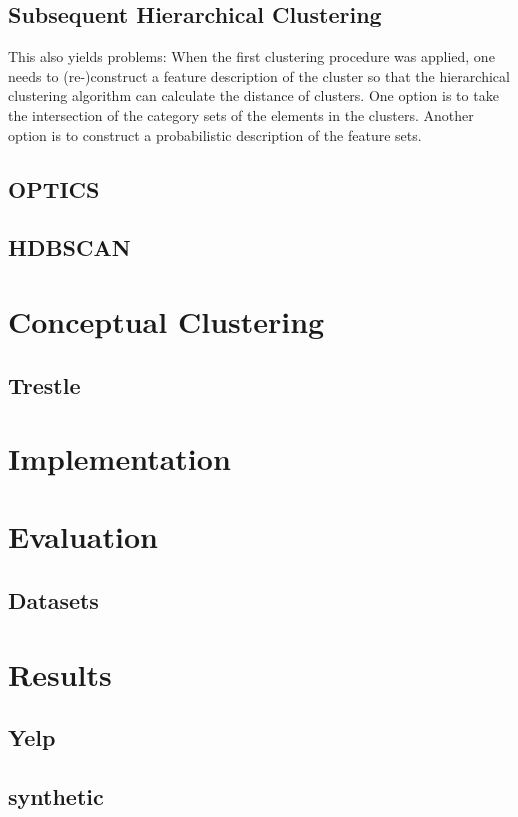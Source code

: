 \subsection{Subsequent Hierarchical Clustering}
This also yields problems: When the first clustering procedure was applied, one needs to (re-)construct a feature description of the cluster so that the hierarchical clustering algorithm can calculate the distance of clusters. One option is to take the intersection of the category sets of the elements in the clusters. Another option is to construct a probabilistic description  of the feature sets. 

\subsection{OPTICS}\label{\positionnumber}
\subsection{HDBSCAN}\label{\positionnumber}



\section{Conceptual Clustering}
\subsection{Trestle}

\section{Implementation}


\section{Evaluation}
 \subsection{Datasets}
   
  \section{Results}
    \subsection{Yelp}
    \subsection{synthetic}



